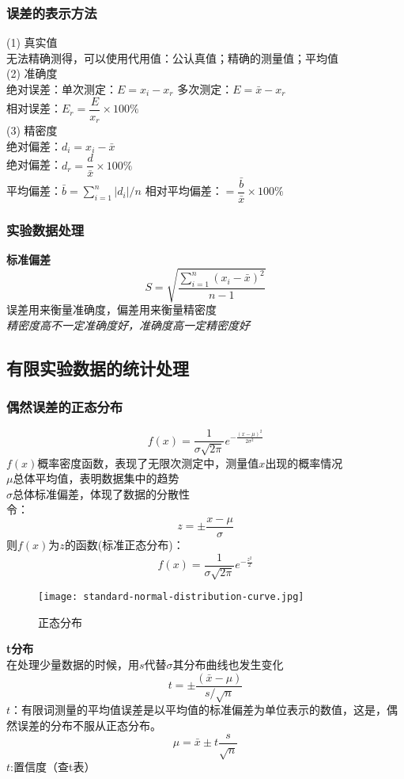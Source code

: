 \documentclass[utf8,a4paper,12pt]{ctexart}
\begin{document}
\subsubsection{误差的表示方法}
(1) 真实值\\
无法精确测得，可以使用代用值：公认真值；精确的测量值；平均值\\
(2) 准确度\\
绝对误差：单次测定：$E = x_i - x_r$ 多次测定：$E = \bar{x} - x_r$\\
相对误差：$E_r = \dfrac{E}{x_r} \times 100\%$\\
(3) 精密度\\
绝对偏差：$d_i = x_i - \bar{x}$\\
绝对偏差：$d_r = \dfrac{d}{\bar{x}} \times 100\%$\\
平均偏差：$\displaystyle\bar{b} = \sum_{i=1}^n|d_i|/n$
相对平均偏差：$ = \dfrac{\bar{b}}{\bar{x}}\times 100\%$
\subsubsection{实验数据处理}
{\bf 标准偏差}
\[
	S = \sqrt{\frac{\displaystyle\sum_{i=1}^n(x_i - \bar{x})^2}{n-1}}
\]
误差用来衡量准确度，偏差用来衡量精密度\\
\emph{精密度高不一定准确度好，准确度高一定精密度好}

\subsection{有限实验数据的统计处理}
\subsubsection{偶然误差的正态分布}
\[
	f(x) = \frac{1}{\sigma\sqrt{2\pi}}e^{-\frac{(x-\mu)^2}{2\sigma^2}}
\]
$f(x)$概率密度函数，表现了无限次测定中，测量值$x$出现的概率情况\\
$\mu$总体平均值，表明数据集中的趋势\\
$\sigma$总体标准偏差，体现了数据的分散性\\
令：
\[
	z = \pm \frac{x-\mu}{\sigma}
\]
则$f(x)$为$z$的函数(标准正态分布)：
\[
	f(x) = \frac{1}{\sigma\sqrt{2\pi}}e^{-\frac{z^2}{2}}
\]
\begin{figure}[H]
\centering
\texttt{[image: standard-normal-distribution-curve.jpg]}
\caption{正态分布}
\end{figure}
{\bf t分布}\\
在处理少量数据的时候，用$s$代替$\sigma$其分布曲线也发生变化\\
\[
	t = \pm \frac{(\bar{x}-\mu)}{s/\sqrt{n}}
\]
$t$：有限词测量的平均值误差是以平均值的标准偏差为单位表示的数值，这是，偶然误差的分布不服从正态分布。
\[
	\mu = \bar{x}\pm t\frac{s}{\sqrt{n}}
\]
$t$:置信度（查t表）\\
\end{document}
